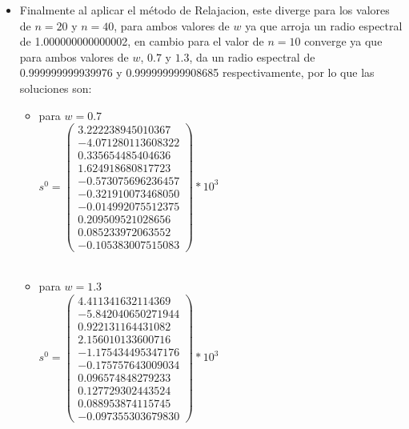 \documentclass{udpreport}
\begin{document}
\begin{enumerate}
\begin{enumerate}
\begin{itemize}
 				\item Finalmente al aplicar el método de Relajacion, este diverge para los valores de $n= 20$ y $n = 40$, para ambos valores de $w$ ya que arroja un radio espectral de 1.000000000000002, en cambio para el valor de $n = 10$ converge ya que para ambos valores de $w$, $0.7$ y $1.3$, da un radio espectral de 0.999999999939976 y 0.999999999908685 respectivamente, por lo que las soluciones son:
 				\begin{itemize}
 				    \item para $ w = 0.7$\\
 				    $s^{0} = \left(\begin{array}{c} 3.222238945010367\\ -4.071280113608322\\ 0.335654485404636\\ 1.624918680817723\\ -0.573075696236457\\ -0.321910073468050\\ -0.014992075512375\\  0.209509521028656\\  0.085233972063552\\-0.105383007515083
 				\end{array}\right)*10^3$
 				\\
 				\\
 				\item para $ w = 1.3$\\
 				    $s^{0} = \left(\begin{array}{c} 4.411341632114369\\ -5.842040650271944\\ 0.922131164431082\\ 2.156010133600716\\ -1.175434495347176\\ -0.175757643009034\\  0.096574848279233\\  0.127729302443524\\  0.088953874115745\\-0.097355303679830
 				\end{array}\right)*10^3$
 				\\
 				\\
 				    

\end{itemize}
\end{itemize}
\end{enumerate}
\end{enumerate}
\end{document}
